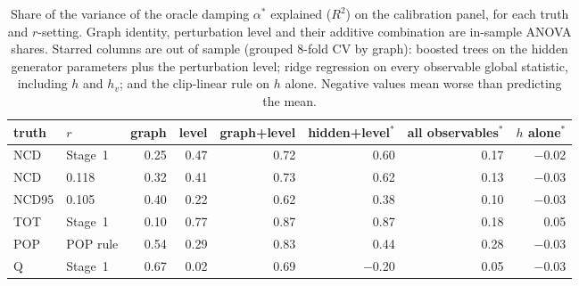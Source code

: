 \begin{table}[t]
\centering
\footnotesize
\caption{Share of the variance of the oracle damping $\alpha^*$ explained ($R^2$) on the calibration panel, for each truth and $r$-setting. Graph identity, perturbation level and their additive combination are in-sample ANOVA shares. Starred columns are out of sample (grouped 8-fold CV by graph): boosted trees on the hidden generator parameters plus the perturbation level; ridge regression on every observable global statistic, including $h$ and $h_v$; and the clip-linear rule on $h$ alone. Negative values mean worse than predicting the mean.}
\label{tab:stage2dec}
\begin{tabular}{@{}llrrrrrr@{}}
\toprule
truth & $r$ & graph & level & graph+level & hidden+level$^{*}$ & all observables$^{*}$ & $h$ alone$^{*}$ \\
\midrule
NCD & Stage~1 & 0.25 & 0.47 & 0.72 & 0.60 & 0.17 & $-$0.02 \\
NCD & 0.118 & 0.32 & 0.41 & 0.73 & 0.62 & 0.13 & $-$0.03 \\
NCD95 & 0.105 & 0.40 & 0.22 & 0.62 & 0.38 & 0.10 & $-$0.03 \\
TOT & Stage~1 & 0.10 & 0.77 & 0.87 & 0.87 & 0.18 & 0.05 \\
POP & POP rule & 0.54 & 0.29 & 0.83 & 0.44 & 0.28 & $-$0.03 \\
Q & Stage~1 & 0.67 & 0.02 & 0.69 & $-$0.20 & 0.05 & $-$0.03 \\
\bottomrule
\end{tabular}
\end{table}
